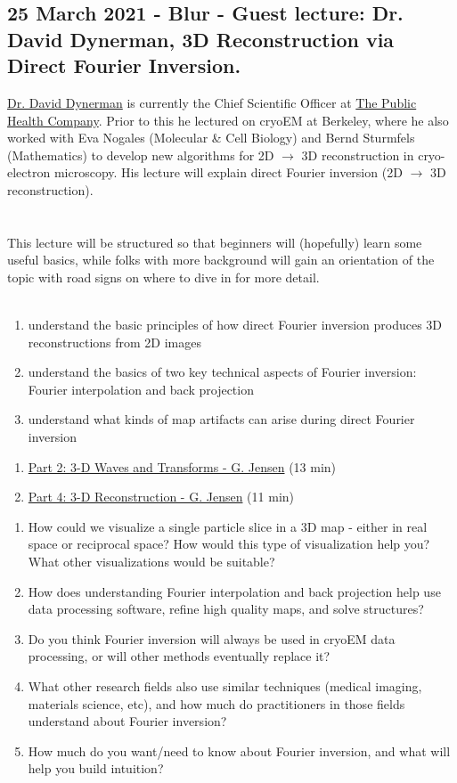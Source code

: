 \documentclass[11pt, oneside]{article}   	%
\begin{document}
\subsection{25 March 2021 - Blur - Guest lecture: Dr. David Dynerman, 3D Reconstruction via Direct Fourier Inversion.}
\href{https://www.linkedin.com/in/david-dynerman-6a4a47101/}{Dr. David Dynerman} is currently the Chief Scientific Officer at \href{https://www.thepublichealthco.com/}{The Public Health Company}. Prior to this he lectured on cryoEM at Berkeley, where he also worked with Eva Nogales (Molecular \& Cell Biology) and Bernd Sturmfels (Mathematics) to develop new algorithms for 2D $\rightarrow$ 3D reconstruction in cryo-electron microscopy. His lecture will explain direct Fourier inversion (2D $\rightarrow$ 3D reconstruction). \\ \\
\\
This lecture will be structured so that beginners will (hopefully) learn some useful basics, while folks with more background will gain an orientation of the topic with road signs on where to dive in for more detail.
\\ \\
\begin{enumerate}
  \item understand the basic principles of how direct Fourier inversion produces 3D reconstructions from 2D images
  \item understand the basics of two key technical aspects of Fourier inversion: Fourier interpolation and back projection
  \item understand what kinds of map artifacts can arise during direct Fourier inversion
\end{enumerate}
\begin{enumerate}
	\item \href{https://youtu.be/INtehLmqfmA}{Part 2: 3-D Waves and Transforms - G. Jensen} (13 min)
	\item \href{https://youtu.be/_Ngybc0Rjo0}{Part 4: 3-D Reconstruction - G. Jensen} (11 min)
\end{enumerate}
\begin{enumerate}
	\item How could we visualize a single particle slice in a 3D map - either in real space or reciprocal space? How would this type of visualization help you? What other visualizations would be suitable?
	\item How does understanding Fourier interpolation and back projection help use data processing software, refine high quality maps, and solve structures?
	\item Do you think Fourier inversion will always be used in cryoEM data processing, or will other methods eventually replace it?
	\item What other research fields also use similar techniques (medical imaging, materials science, etc), and how much do practitioners in those fields understand about Fourier inversion?
	\item How much do you want/need to know about Fourier inversion, and what will help you build intuition?
\end{enumerate}
\end{document}
